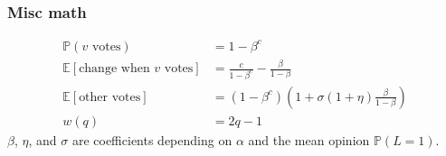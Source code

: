 \documentclass{beamer}
\newcommand\E[0]{\mathbb{E}}
\newcommand\prob[0]{\mathbb{P}}
\begin{document}
		\begin{frame}\frametitle{Misc math}
		  \begin{align*}	
		  		\prob(v \text{ votes}) &= 1-\beta^c \\ 
				\E[\text{change when } v \text{ votes}] &= \frac{c}{1-\beta^{c}} - \frac{\beta}{1-\beta} \\ 
				\E[\text{other votes}] &= (1-\beta^c)\left(1 + \sigma (1+\eta) \frac{\beta}{1-\beta}\right) \\ 
				w(q) &= 2q - 1
		  	\end{align*}
		  	$\beta$, $\eta$, and $\sigma$ are coefficients depending on $\alpha$ and the mean opinion $\prob(L = 1)$. 
		\end{frame}
	
\end{document}
